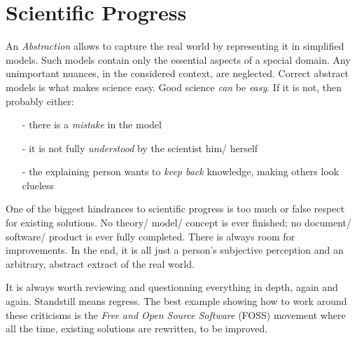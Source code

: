 %
%
%
%
%
%
%

\section*{Scientific Progress}
\label{scientific_progress_heading}

An \emph{Abstraction} allows to capture the real world by representing it in
simplified models. Such models contain only the essential aspects of a special
domain. Any unimportant nuances, in the considered context, are neglected.
Correct abstract models is what makes science easy. Good science \emph{can} be
\emph{easy}. If it is not, then probably either:

\begin{itemize}
    \item[-] there is a \emph{mistake} in the model
    \item[-] it is not fully \emph{understood} by the scientist him/ herself
    \item[-] the explaining person wants to \emph{keep back} knowledge, making
        others look clueless
\end{itemize}

One of the biggest hindrances to scientific progress is too much or false
respect for existing solutions. No theory/ model/ concept is ever finished;
no document/ software/ product is ever fully completed. There is always room
for improvements. In the end, it is all just a person's subjective perception
and an arbitrary, abstract extract of the real world.

It is always worth reviewing and questionning everything in depth, again and
again. Standstill means regress. The best example showing how to work around
these criticisms is the \emph{Free and Open Source Software} (FOSS) movement
where all the time, existing solutions are rewritten, to be improved.
